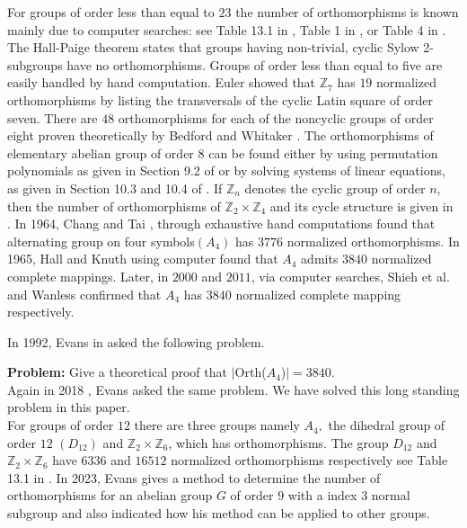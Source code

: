 \documentclass[11pt,a4paper]{article}
\theoremstyle{definition}
\theoremstyle{remark}
\begin{document}
	For groups of order less than equal to $23$ the number of orthomorphisms is known mainly due to computer searches: see Table 13.1 in \cite{evans}, Table 1 in \cite{mckay}, or Table 4 in \cite{wanless}.
	The Hall-Paige theorem \cite{hall} states that groups having non-trivial, cyclic Sylow 2-subgroups have no orthomorphisms. Groups of order less than equal to five are easily handled by hand computation. Euler \cite{euler} showed that $\mathbb{Z}_{7}$ has $19$ normalized orthomorphisms by listing the transversals of the cyclic Latin square of order seven. There are $48$  orthomorphisms for each of the noncyclic groups of order eight proven theoretically by Bedford and Whitaker \cite{bedford}. The orthomorphisms of elementary abelian group of order $8$ can be found either by using permutation polynomials as given in Section 9.2 of \cite{evans}  or by solving systems of linear equations, as given in Section 10.3 and 10.4 of \cite{evans}. If $\mathbb{Z}_{n}$ denotes the cyclic group of order $n$, then the number of orthomorphisms of $\mathbb{Z}_{2} \times \mathbb{Z}_{4}$ and its cycle structure is given in \cite{jain}.  	
	 In 1964, Chang and Tai \cite{chang}, through exhaustive hand computations found that alternating group on four symbols$(A_{4})$ has $3776$ normalized orthomorphisms. In 1965, Hall and Knuth \cite{knuth} using computer found that $A_{4}$ admits $3840$ normalized complete mappings. Later, in $2000$ and $2011$, via computer searches, Shieh et al. \cite{shieh} and Wanless \cite{wanless} confirmed that $A_{4}$ has $3840$ normalized complete mapping respectively.
	 
	  
	  In 1992, Evans  in \cite[Problem 22, p. 98]{evans3}  asked the following problem.
	 
	 \noindent \textbf{Problem:} Give a theoretical proof that $|$Orth($A_{4}$)$| = 3840$.\\
	 Again in 2018 \cite[Problem 16.76, p. 514]{evans}, Evans asked the same problem. We have solved this long standing problem in this paper.\\
 For groups of order $12$ there are three groups namely $A_{4},$ the dihedral group of order $12$ $(D_{12})$ and $\mathbb{Z}_{2} \times \mathbb{Z}_{6}$, which has orthomorphisms. The group $D_{12}$ and $\mathbb{Z}_{2} \times \mathbb{Z}_{6}$ have $6336$ and $16512$ normalized orthomorphisms respectively see Table 13.1 in \cite{evans}. In 2023, Evans \cite{evans2}  gives a method to determine the number of orthomorphisms for an abelian group $G$ of order $9$ with a index $3$ normal subgroup and also indicated how his method can be applied to other groups.
 
\end{document}
